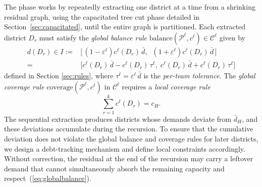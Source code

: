 \documentclass[preprint,12pt,authoryear]{elsarticle}
\theoremstyle{definition}
\begin{document}
The phase works by repeatedly extracting one district at a time from a shrinking residual graph, using the capacitated tree cut phase detailed in Section~\ref{sec:capacitated}, until the entire graph is partitioned. Each extracted district $D_r$ must satisfy the \emph{global balance rule} $\mathrm{balance}(\mathcal{P}^\ell, c^\ell) \in \mathcal{C}^\ell$ given by
%
\begin{align}\label{eq:globalbalance}
    d(D_r) \in I
    :=& \bigl[\, (1 - \varepsilon^{\ell}) c^{\ell}(D_r)\,\bar{d}, \;\;
                      (1 + \varepsilon^{\ell}) c^{\ell}(D_r)\,\bar{d} \,\bigr] \\[4pt]
    =& \bigl[ c^{\ell}(D_r)\,\bar{d} - c^{\ell}(D_r)\,\tau^\ell,\; c^{\ell}(D_r)\,\bar{d} + c^{\ell}(D_r)\,\tau^\ell  \bigr]
\end{align}
%
\begingroup\sloppy
defined in Section \ref{sec:rules}, where $\tau^\ell = \varepsilon^{\ell}\,\bar{d}$ is the \emph{per-team tolerance}. The \emph{global coverage rule} $\mathrm{coverage}(\mathcal{P}^\ell, c^\ell)$ in $\mathcal{C}^{\ell}$ requires a \emph{local coverage rule}
%
\begin{equation}\label{eq:localcoverage}
\sum_{r=1}^{k} c^{\ell}(D_r) = c_H.
\end{equation}
%
The sequential extraction produces districts whose demands deviate from $\bar{d}_H$, and these deviations accumulate during the recursion. To ensure that the cumulative deviation does not violate the global balance and coverage rules for later districts, we design a debt-tracking mechanism and define local constraints accordingly. Without correction, the residual at the end of the recursion may carry a leftover demand that cannot simultaneously absorb the remaining capacity and respect~(\ref{eq:globalbalance}).
\endgroup
\end{document}

